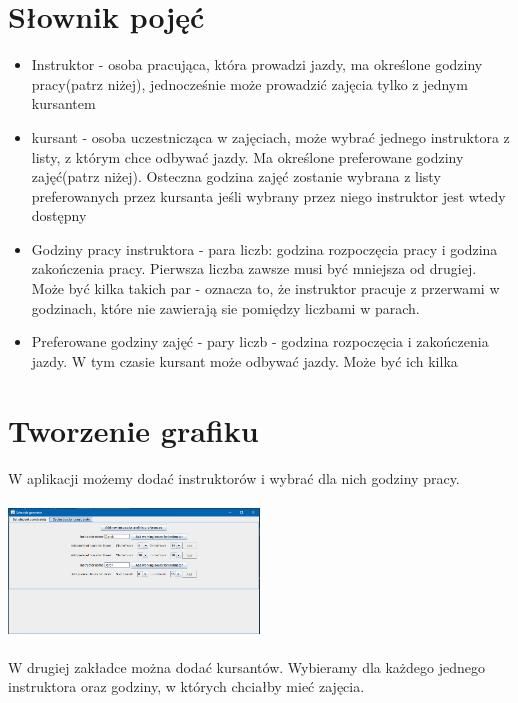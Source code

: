 \documentclass{article}
\begin{document}
\section{Słownik pojęć}
\par
\begin{itemize}
	\item Instruktor - osoba pracująca, która prowadzi jazdy, ma określone godziny pracy(patrz niżej), jednocześnie może prowadzić zajęcia tylko z jednym kursantem
	\item kursant - osoba uczestnicząca w zajęciach, może wybrać jednego instruktora z listy, z którym chce odbywać jazdy. Ma określone preferowane godziny zajęć(patrz niżej). Osteczna godzina zajęć zostanie wybrana z listy preferowanych przez kursanta jeśli wybrany przez niego instruktor jest wtedy dostępny  
	\item Godziny pracy instruktora - para liczb: godzina rozpoczęcia pracy i godzina zakończenia pracy. Pierwsza liczba zawsze musi być mniejsza od drugiej. Może być kilka takich par - oznacza to, że instruktor pracuje z przerwami w godzinach, które nie zawierają sie pomiędzy liczbami w parach.
	\item Preferowane godziny zajęć - pary liczb - godzina rozpoczęcia i zakończenia jazdy. W tym czasie kursant może odbywać jazdy. Może być ich kilka

\end{itemize}
\section{Tworzenie grafiku}
\par
W aplikacji możemy dodać instruktorów i wybrać dla nich godziny pracy. \\ \\ 

\includegraphics[width=0.5\textwidth]{screen-instuktorzy.png} \\ \\
W drugiej zakładce można dodać kursantów. Wybieramy dla każdego jednego instruktora oraz godziny, w których chciałby mieć zajęcia. \\ \\
\end{document}
